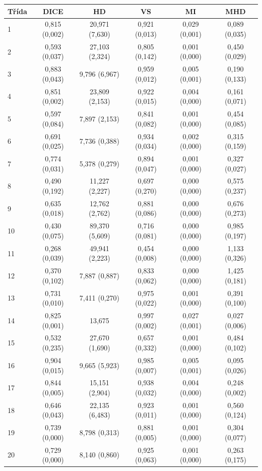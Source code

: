 \begin{tabular}{l c c c c c}
 \hline
Třída & DICE & HD & VS & MI & MHD \\ \hline
1 & 0,815 (0,002) & 20,971 (7,630) & 0,921 (0,013) & 0,029 (0,001) & 0,089 (0,035) \\
2 & 0,593 (0,037) & 27,103 (2,324) & 0,805 (0,142) & 0,001 (0,000) & 0,450 (0,029) \\
3 & 0,883 (0,043) & 9,796 (6,967) & 0,959 (0,012) & 0,005 (0,001) & 0,190 (0,133) \\
4 & 0,851 (0,002) & 23,809 (2,153) & 0,922 (0,015) & 0,004 (0,000) & 0,161 (0,071) \\
5 & 0,597 (0,084) & 7,897 (2,153) & 0,841 (0,082) & 0,001 (0,000) & 0,454 (0,085) \\
6 & 0,691 (0,025) & 7,736 (0,388) & 0,934 (0,034) & 0,002 (0,000) & 0,315 (0,159) \\
7 & 0,774 (0,031) & 5,378 (0,279) & 0,894 (0,047) & 0,001 (0,000) & 0,327 (0,027) \\
8 & 0,490 (0,192) & 11,227 (2,227) & 0,697 (0,270) & 0,000 (0,000) & 0,575 (0,237) \\
9 & 0,635 (0,018) & 12,762 (2,762) & 0,881 (0,086) & 0,000 (0,000) & 0,676 (0,273) \\
10 & 0,430 (0,075) & 89,370 (5,609) & 0,716 (0,081) & 0,000 (0,000) & 0,985 (0,197) \\
11 & 0,268 (0,039) & 49,941 (2,223) & 0,454 (0,008) & 0,000 (0,000) & 1,133 (0,326) \\
12 & 0,370 (0,102) & 7,887 (0,887) & 0,833 (0,062) & 0,000 (0,000) & 1,425 (0,181) \\
13 & 0,731 (0,010) & 7,411 (0,270) & 0,975 (0,022) & 0,001 (0,000) & 0,391 (0,100) \\
14 & 0,825 (0,001) & 13,675 & 0,997 (0,002) & 0,027 (0,001) & 0,027 (0,006) \\
15 & 0,532 (0,235) & 27,670 (1,690) & 0,657 (0,332) & 0,001 (0,000) & 0,484 (0,102) \\
16 & 0,904 (0,015) & 9,665 (5,923) & 0,985 (0,007) & 0,005 (0,001) & 0,095 (0,026) \\
17 & 0,844 (0,005) & 15,151 (2,904) & 0,938 (0,032) & 0,004 (0,000) & 0,248 (0,002) \\
18 & 0,646 (0,043) & 22,135 (6,483) & 0,923 (0,011) & 0,001 (0,000) & 0,560 (0,124) \\
19 & 0,739 (0,000) & 8,798 (0,313) & 0,881 (0,005) & 0,001 (0,000) & 0,304 (0,077) \\
20 & 0,729 (0,000) & 8,140 (0,860) & 0,925 (0,063) & 0,001 (0,000) & 0,263 (0,175) \\

\end{tabular}
